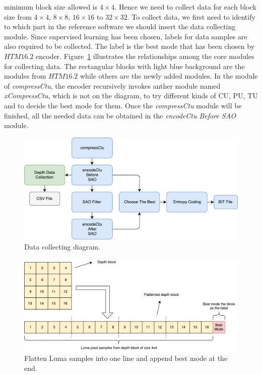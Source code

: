 minimum block size allowed is \(4\times4\).
Hence we need to collect data for each block size from 
\(4\times4\), \(8\times8\), \(16\times16\) to \(32\times32\).
To collect data, we first need to identify
to which part in the reference software
we should insert the data collecting module.
Since supervised learning has been chosen,
labels for data samples are also required to be collected.
The label is the best mode that has been chosen by \(HTM16.2\) encoder.
Figure~\ref{fig:data-collection-diagram} illustrates
the relationships among the core modules for collecting data.
The rectangular blocks with light blue background are the modules from
\(HTM16.2\) while others are the newly added modules.
In the module of \emph{compressCtu}, the encoder recursively invokes
anther module named \emph{xCompressCtu}, which is not on the diagram, to
try different kinds of CU, PU, TU and to decide the best mode for them.
Once the \emph{compressCtu} module will be finished, all the needed
data can be obtained in the \emph{encodeCtu Before SAO} module.
\begin{figure}
    \centering
    \includegraphics[width=\textwidth,height=\textheight,keepaspectratio]{Figures/thesis-data-collecting-diagram.pdf}
    \caption[Data collecting diagram]{Data collecting diagram.}
    \label{fig:data-collection-diagram}
\end{figure}
\begin{figure}
    \centering
    \includegraphics[width=\textwidth,height=\textheight,keepaspectratio]{Figures/flattern-pixels-into-single-line.pdf}
    \caption[Flatten Luma samples into one line and append best mode at the end]{Flatten Luma samples into one line and append best mode at the end.}\label{fig:flattern-data-into-one-dimension}
\end{figure}
